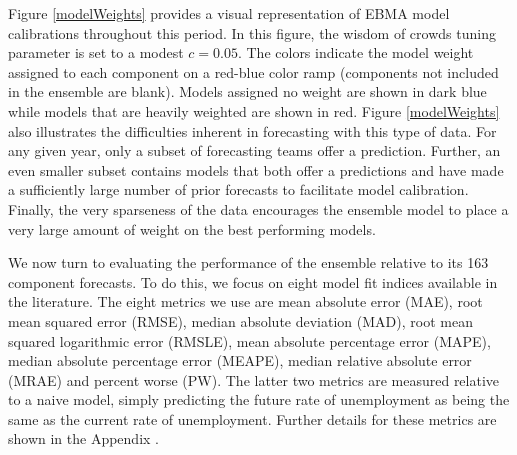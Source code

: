 \documentclass[12pt,fullpage,endnotes]{article}
\begin{document}
Figure \ref{modelWeights} provides a visual representation of EBMA
model calibrations throughout this period.  In this figure, the wisdom
of crowds tuning parameter is set to a modest $c=0.05$.  The colors
indicate the model weight assigned to each component on a red-blue
color ramp (components not included in the ensemble are blank).
Models assigned no weight are shown in dark blue while models that are
heavily weighted are shown in red. Figure \ref{modelWeights} also illustrates
the difficulties inherent in
forecasting with this type of data.  For any given year, only a subset
of forecasting teams offer a prediction.  Further, an even smaller
subset contains models that both offer a predictions and have made a
sufficiently large number of prior forecasts to facilitate model
calibration.  Finally, the very sparseness of the data encourages the
ensemble model to place a very large amount of weight on the best
performing models.  

We now turn to evaluating the performance of the ensemble relative to
its 163 component forecasts.  To do this, we focus on eight model fit
indices available in the literature.  The eight metrics we use are
mean absolute error (MAE), root mean squared error (RMSE), median
absolute deviation (MAD), root mean squared logarithmic error (RMSLE),
mean absolute percentage error (MAPE), median absolute percentage
error (MEAPE), median relative absolute error (MRAE) and percent worse
(PW).  The latter two metrics are measured relative to a naive model,
simply predicting the future rate of unemployment as being the same as
the current rate of unemployment.  Further details for these metrics
are shown in the Appendix \citep{brandt:freeman:schrodt:2011}.
\end{document}
